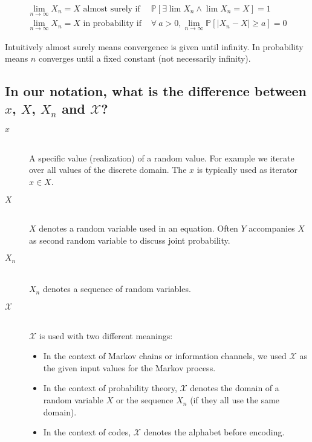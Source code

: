 \documentclass[a4paper]{article}
\theoremstyle{definition}
\begin{document}
\begin{align*}
  \lim_{n \rightarrow \infty} X_n = X \text{ almost surely if }
      & \mathbb{P}[\exists \lim X_n \land \lim X_n = X] = 1 \\
  \lim_{n \rightarrow \infty} X_n = X \text{ in probability if }
      & \forall\: a > 0, \lim_{n \rightarrow \infty} \mathbb{P}[\left|X_n - X\right| \geq a] = 0
\end{align*}

Intuitively almost surely means convergence is given until infinity. In probability means $n$ converges until a fixed constant (not necessarily infinity).

\subsection{In our notation, what is the difference between $x$, $X$, $X_n$ and $\mathcal{X}$?}

\begin{description}
  \item[$x$] \hfill{} \\
    A specific value (realization) of a random value. For example we iterate over all values of the discrete domain. The $x$ is typically used as iterator $x \in X$.

  \item[$X$] \hfill{} \\
    $X$ denotes a random variable used in an equation. Often $Y$ accompanies $X$ as second random variable to discuss joint probability.

  \item[$X_n$] \hfill{} \\
    $X_n$ denotes a sequence of random variables.

  \item[$\mathcal{X}$] \hfill{} \\
    $\mathcal{X}$ is used with two different meanings:
    \begin{itemize}
      \item In the context of Markov chains or information channels, we used $\mathcal{X}$ as the given input values for the Markov process.
      \item In the context of probability theory, $\mathcal{X}$ denotes the domain of a random variable $X$ or the sequence $X_n$ (if they all use the same domain).
      \item In the context of codes, $\mathcal{X}$ denotes the alphabet before encoding.
    \end{itemize}
\end{description}
\end{document}
